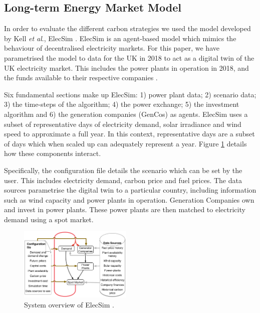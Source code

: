 \documentclass[final,3p,times,twocolumn,numbers]{elsarticle}
\begin{document}
\subsection{Long-term Energy Market Model}


In order to evaluate the different carbon strategies we used the model developed by Kell \textit{et al}., ElecSim \cite{Kell,Kell2020}. ElecSim is an agent-based model which mimics the behaviour of decentralised electricity markets. For this paper, we have parametrised the model to data for the UK in 2018 to act as a digital twin of the UK electricity market. This includes the power plants in operation in 2018, and the funds available to their respective companies \cite{dukes_511, companies_house}.

Six fundamental sections make up ElecSim: 1) power plant data; 2) scenario data; 3) the time-steps of the algorithm; 4) the power exchange; 5) the investment algorithm and 6) the generation companies (GenCos) as agents. ElecSim uses a subset of representative days of electricity demand, solar irradiance and wind speed to approximate a full year. In this context, representative days are a subset of days which when scaled up can adequately represent a year. Figure \ref{fig:model_details} details how these components interact. 

Specifically, the configuration file details the scenario which can be set by the user. This includes electricity demand, carbon price and fuel prices. The data sources parametrise the digital twin to a particular country, including information such as wind capacity and power plants in operation. Generation Companies own and invest in power plants. These power plants are then matched to electricity demand using a spot market.



\begin{figure}
	\includegraphics[width=0.48\textwidth,natwidth=610,natheight=400]{figures/methods/System_overview_large.png}
	\caption{System overview of ElecSim \cite{Kell}.}
	\label{fig:model_details}
\end{figure}
\end{document}
